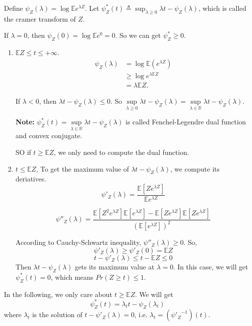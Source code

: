 \documentclass[11pt]{article}
\def\BR{{\mathbb R}}
\def\BE{{\mathbb E}}
\begin{document}
Define $\psi_Z(\lambda) = \log\BE e^{\lambda Z}$.
Let $\psi_Z^*(t) \triangleq \sup_{\lambda \geq 0} \lambda t - \psi_Z(\lambda)$, which is called the cramer transform of $Z$.

If $\lambda = 0$, then $\psi_Z(0) = \log \BE e^0 = 0$. So we can get $\psi_Z^* \geq 0$.

\begin{enumerate}
\item $\BE Z \leq t \leq +\infty$.
\[\begin{split}
\psi_Z(\lambda) &= \log \BE(e^{\lambda Z}) \\
&\geq \log e^{\lambda \BE Z} \\
&= \lambda \BE Z.
\end{split}\]

If $\lambda < 0$, then $\lambda t - \psi_Z(\lambda) \leq 0$. So $\sup\limits_{\lambda \geq 0} \lambda t - \psi_Z(\lambda) = \sup\limits_{\lambda \in \BR} \lambda t - \psi_Z(\lambda)$.

\textbf{Note:} $\psi_Z^*(t) = \sup\limits_{\lambda\in\BR} \lambda t - \psi_Z(\lambda)$ is called Fenchel-Legendre dual function and convex conjugate.

SO if $t \geq \BE Z$, we only need to compute the dual function.

\item $t \leq \BE Z$,
To get the maximum value of $\lambda t - \psi_Z(\lambda)$, we compute its deriatives.
\[\psi'_Z(\lambda)  = \frac{\BE[Z e^{\lambda Z}]}{\BE e^{\lambda Z}} \]

\[\psi''_Z(\lambda) = \frac{\BE[Z^2 e^{\lambda Z}]\BE[e^{\lambda Z}] - \BE[Z e^{\lambda Z}]\BE[Z e^{\lambda Z}]}{(\BE[e^{\lambda Z}])^2} \]

According to Cauchy-Schwartz inequality, $\psi''_Z(\lambda) \geq 0$. So, \[\psi'_Z(\lambda) \geq \psi'_Z(0) = \BE Z \]
\[t - \psi'_Z(\lambda) \leq t - \BE Z \leq 0 \]
Then $\lambda t - \psi_Z(\lambda)$  gets its maximum value at $\lambda = 0$.
In this case, we will get $\psi_Z^*(t) = 0$, which means $Pr({Z \geq t}) \leq 1$. 
\end{enumerate}

In the following, we only care about $t \geq \BE Z$. We will get 
\[\psi_Z^*(t) = \lambda_t t - \psi_Z(\lambda_t) \]
where $\lambda_t$ is the solution of $t - \psi'_Z(\lambda) = 0$, i.e. $\lambda_t = ({\psi'_Z}^{-1})(t)$.
\end{document}

